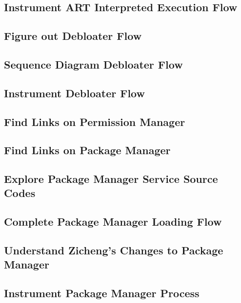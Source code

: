 \subsection{Instrument ART Interpreted Execution Flow}
\subsection{Figure out Debloater Flow} 
\subsection{Sequence Diagram Debloater Flow}
\subsection{Instrument Debloater Flow}
\subsection{Find Links on Permission Manager}
\subsection{Find Links on Package Manager}
\subsection{Explore Package Manager Service Source Codes}
\subsection{Complete Package Manager Loading Flow}
\subsection{Understand Zicheng's Changes to Package Manager}
\subsection{Instrument Package Manager Process}

% 


